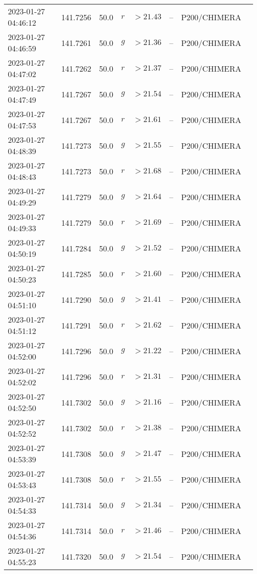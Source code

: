 \documentclass{nature_plusfigure}
\begin{document}
\begin{supplement}
\begin{center}
\begin{longtable}{llllllll}
2023-01-27 04:46:12 & 141.7256 & 50.0 & $r$ & $>21.43$ & -- & P200/CHIMERA &  \\ 
2023-01-27 04:46:59 & 141.7261 & 50.0 & $g$ & $>21.36$ & -- & P200/CHIMERA &  \\ 
2023-01-27 04:47:02 & 141.7262 & 50.0 & $r$ & $>21.37$ & -- & P200/CHIMERA &  \\ 
2023-01-27 04:47:49 & 141.7267 & 50.0 & $g$ & $>21.54$ & -- & P200/CHIMERA &  \\ 
2023-01-27 04:47:53 & 141.7267 & 50.0 & $r$ & $>21.61$ & -- & P200/CHIMERA &  \\ 
2023-01-27 04:48:39 & 141.7273 & 50.0 & $g$ & $>21.55$ & -- & P200/CHIMERA &  \\ 
2023-01-27 04:48:43 & 141.7273 & 50.0 & $r$ & $>21.68$ & -- & P200/CHIMERA &  \\ 
2023-01-27 04:49:29 & 141.7279 & 50.0 & $g$ & $>21.64$ & -- & P200/CHIMERA &  \\ 
2023-01-27 04:49:33 & 141.7279 & 50.0 & $r$ & $>21.69$ & -- & P200/CHIMERA &  \\ 
2023-01-27 04:50:19 & 141.7284 & 50.0 & $g$ & $>21.52$ & -- & P200/CHIMERA &  \\ 
2023-01-27 04:50:23 & 141.7285 & 50.0 & $r$ & $>21.60$ & -- & P200/CHIMERA &  \\ 
2023-01-27 04:51:10 & 141.7290 & 50.0 & $g$ & $>21.41$ & -- & P200/CHIMERA &  \\ 
2023-01-27 04:51:12 & 141.7291 & 50.0 & $r$ & $>21.62$ & -- & P200/CHIMERA &  \\ 
2023-01-27 04:52:00 & 141.7296 & 50.0 & $g$ & $>21.22$ & -- & P200/CHIMERA &  \\ 
2023-01-27 04:52:02 & 141.7296 & 50.0 & $r$ & $>21.31$ & -- & P200/CHIMERA &  \\ 
2023-01-27 04:52:50 & 141.7302 & 50.0 & $g$ & $>21.16$ & -- & P200/CHIMERA &  \\ 
2023-01-27 04:52:52 & 141.7302 & 50.0 & $r$ & $>21.38$ & -- & P200/CHIMERA &  \\ 
2023-01-27 04:53:39 & 141.7308 & 50.0 & $g$ & $>21.47$ & -- & P200/CHIMERA &  \\ 
2023-01-27 04:53:43 & 141.7308 & 50.0 & $r$ & $>21.55$ & -- & P200/CHIMERA &  \\ 
2023-01-27 04:54:33 & 141.7314 & 50.0 & $g$ & $>21.34$ & -- & P200/CHIMERA &  \\ 
2023-01-27 04:54:36 & 141.7314 & 50.0 & $r$ & $>21.46$ & -- & P200/CHIMERA &  \\ 
2023-01-27 04:55:23 & 141.7320 & 50.0 & $g$ & $>21.54$ & -- & P200/CHIMERA &  \\ 

\end{longtable}
\end{center}
\end{supplement}
\end{document}
